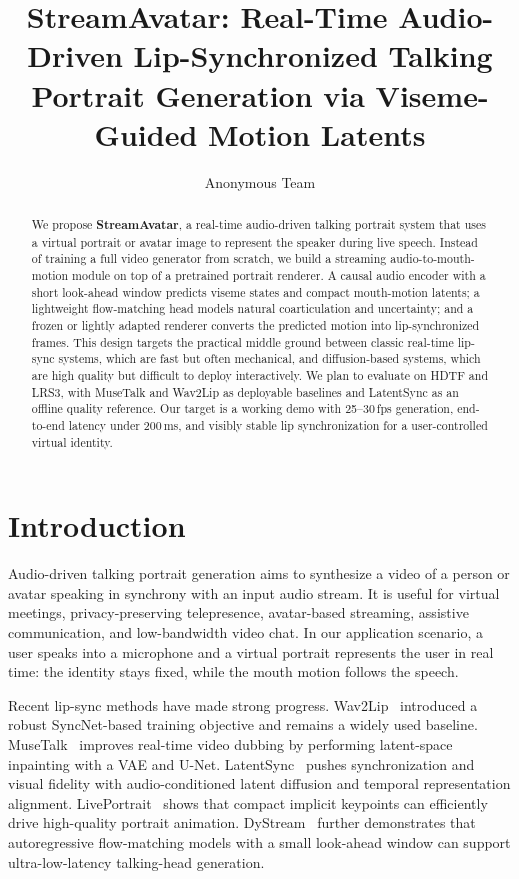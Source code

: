 \documentclass{article}
\title{StreamAvatar: Real-Time Audio-Driven Lip-Synchronized Talking Portrait Generation via Viseme-Guided Motion Latents}
\author{Anonymous Team}
\begin{document}
\maketitle

\begin{abstract}
We propose \textbf{StreamAvatar}, a real-time audio-driven talking portrait system that uses a virtual portrait or avatar image to represent the speaker during live speech. Instead of training a full video generator from scratch, we build a streaming audio-to-mouth-motion module on top of a pretrained portrait renderer. A causal audio encoder with a short look-ahead window predicts viseme states and compact mouth-motion latents; a lightweight flow-matching head models natural coarticulation and uncertainty; and a frozen or lightly adapted renderer converts the predicted motion into lip-synchronized frames. This design targets the practical middle ground between classic real-time lip-sync systems, which are fast but often mechanical, and diffusion-based systems, which are high quality but difficult to deploy interactively. We plan to evaluate on HDTF and LRS3, with MuseTalk and Wav2Lip as deployable baselines and LatentSync as an offline quality reference. Our target is a working demo with 25--30\,fps generation, end-to-end latency under 200\,ms, and visibly stable lip synchronization for a user-controlled virtual identity.
\end{abstract}

\section{Introduction}

Audio-driven talking portrait generation aims to synthesize a video of a person or avatar speaking in synchrony with an input audio stream. It is useful for virtual meetings, privacy-preserving telepresence, avatar-based streaming, assistive communication, and low-bandwidth video chat. In our application scenario, a user speaks into a microphone and a virtual portrait represents the user in real time: the identity stays fixed, while the mouth motion follows the speech.

Recent lip-sync methods have made strong progress. Wav2Lip~\cite{wav2lip} introduced a robust SyncNet-based training objective and remains a widely used baseline. MuseTalk~\cite{musetalk} improves real-time video dubbing by performing latent-space inpainting with a VAE and U-Net. LatentSync~\cite{latentsync} pushes synchronization and visual fidelity with audio-conditioned latent diffusion and temporal representation alignment. LivePortrait~\cite{liveportrait} shows that compact implicit keypoints can efficiently drive high-quality portrait animation. DyStream~\cite{dystream} further demonstrates that autoregressive flow-matching models with a small look-ahead window can support ultra-low-latency talking-head generation.
\end{document}
